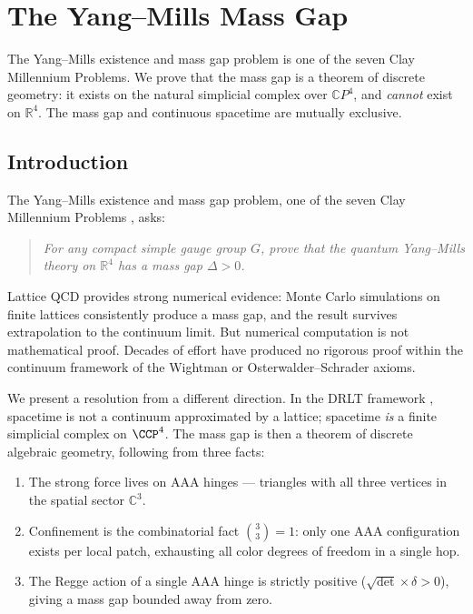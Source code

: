 \documentclass[12pt]{article}
\theoremstyle{remark}
\theoremstyle{definition}
\newcommand{\CP}{\mathbb{C}P}
\newcommand{\CC}{\mathbb{C}}
\newcommand{\RR}{\mathbb{R}}
\begin{document}
\section{The Yang--Mills Mass Gap}
\label{ch:yang_mills}

The Yang--Mills existence and mass gap problem is one of the seven Clay Millennium Problems. We prove that the mass gap is a theorem of discrete geometry: it exists on the natural simplicial complex over $\CP^4$, and \emph{cannot} exist on $\RR^4$. The mass gap and continuous spacetime are mutually exclusive.

\subsection{Introduction}
\label{sec:intro}

The Yang--Mills existence and mass gap problem, one of the seven Clay
Millennium Problems \cite{Clay}, asks:

\begin{quote}
\emph{For any compact simple gauge group $G$, prove that the quantum
Yang--Mills theory on $\RR^4$ has a mass gap $\Delta > 0$.}
\end{quote}

\noindent
Lattice QCD \cite{Wilson, Creutz} provides strong numerical evidence:
Monte Carlo simulations on finite lattices consistently produce a mass
gap, and the result survives extrapolation to the continuum limit. But
numerical computation is not mathematical proof. Decades of effort have
produced no rigorous proof within the continuum framework of the Wightman
\cite{Wightman} or Osterwalder--Schrader \cite{OS} axioms.

We present a resolution from a different direction. In the DRLT framework
, spacetime is not a continuum approximated by a
lattice; spacetime \emph{is} a finite simplicial complex on
$\CCP^4$. The mass gap is then a theorem of discrete algebraic
geometry, following from three facts:

\begin{enumerate}
\item The strong force lives on AAA hinges --- triangles with all three
  vertices in the spatial sector $\CC^3$.
\item Confinement is the combinatorial fact $\binom{3}{3} = 1$: only one
  AAA configuration exists per local patch, exhausting all color degrees
  of freedom in a single hop.
\item The Regge action of a single AAA hinge is strictly positive
  ($\sqrt{\det} \times \delta > 0$), giving a mass gap bounded away
  from zero.
\end{enumerate}
\end{document}
